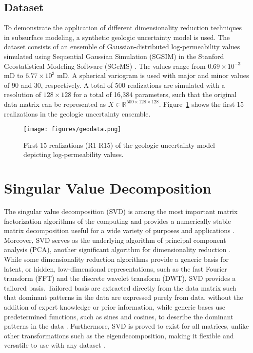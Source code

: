 \documentclass[a4paper,fleqn,12pt]{article}
\begin{document}
\subsection*{Dataset}
To demonstrate the application of different dimensionality reduction techniques in subsurface modeling, a synthetic geologic uncertainty model is used. The dataset consists of an ensemble of Gaussian-distributed log-permeability values simulated using Sequential Gaussian Simulation (SGSIM) in the Stanford Geostatistical Modeling Software (SGeMS) \cite{pyrcz2014geostatistical, pyrcz2024appliedgeostats, remy2009applied}. The values range from $0.69\times10^{-3}$ mD to $6.77\times10^3$ mD. A spherical variogram is used with major and minor values of 90 and 30, respectively. A total of 500 realizations are simulated with a resolution of $128\times128$ for a total of 16,384 parameters, such that the original data matrix can be represented as $X\in\mathbb{R}^{500\times128\times128}$. Figure~\ref{fig:geodata} shows the first 15 realizations in the geologic uncertainty ensemble.

\begin{figure}[H]
    \centering
    \texttt{[image: figures/geodata.png]}
    \caption{First 15 realizations (R1-R15) of the geologic uncertainty model depicting log-permeability values.}
    \label{fig:geodata}
\end{figure}

\pagebreak
\section*{Singular Value Decomposition}
The singular value decomposition (SVD) is among the most important matrix factorization algorithms of the computing and provides a numerically stable matrix decomposition useful for a wide variety of purposes and applications \cite{klema1980singular, stewart1993early}. Moreover, SVD serves as the underlying algorithm of principal component analysis (PCA), another significant algorithm for dimensionality reduction \cite{wall2003singular, baker2005singular}. While some dimensionality reduction algorithms provide a generic basis for latent, or hidden, low-dimensional representations, such as the fast Fourier transform (FFT) and the discrete wavelet transform (DWT), SVD provides a tailored basis. Tailored basis are extracted directly from the data matrix such that dominant patterns in the data are expressed purely from data, without the addition of expert knowledge or prior information, while generic bases use predetermined functions, such as sines and cosines, to describe the dominant patterns in the data \cite{brunton2022data, jafarpour2009reservoir}. Furthermore, SVD is proved to exist for all matrices, unlike other transformations such as the eigendecomposition, making it flexible and versatile to use with any dataset \cite{golub2013matrix}. 
\end{document}
